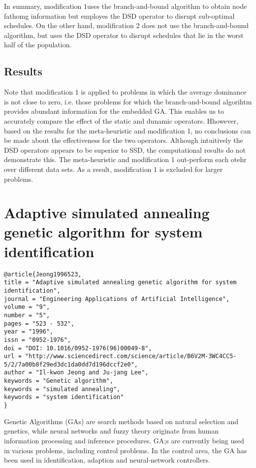\documentclass[pdftex,11pt]{article}
\begin{document}
In summary, modification 1uses the branch-and-bound algorithm to obtain node fathomg information but employes the DSD operator to disrupt sub-optimal schedules. On the other hand, modification 2 does not use the branch-and-bound algorithm, but uses the DSD operator to disrupt schedules that lie in the worst half of the population.

\subsection{Results}
Note that modification 1 is applied to problems in which the average dominance is not close to zero, i.e. those problems for which the branch-and-bound algorihtm provides abundant information for the embedded GA. This enables us to accurately compare the effect of the static and dunamic operators. Hhowever, based on the results for the meta-heuristic and modification 1, no conclusions can be made about the effectiveness for the two operators. Although intuitively the DSD operators appears to be superior to SSD, the computational results do not demonstrate this. The meta-heuristic and modification 1 out-perform each otehr over different data sets. As a result, modification 1 is excluded for larger problems.

\section{Adaptive simulated annealing genetic algorithm for system identification}
\begin{verbatim}
@article{Jeong1996523,
title = "Adaptive simulated annealing genetic algorithm for system identification",
journal = "Engineering Applications of Artificial Intelligence",
volume = "9",
number = "5",
pages = "523 - 532",
year = "1996",
issn = "0952-1976",
doi = "DOI: 10.1016/0952-1976(96)00049-8",
url = "http://www.sciencedirect.com/science/article/B6V2M-3WC4CC5-5/2/7a00b8f29ed3dc1da0dd7d196dccf2e0",
author = "Il-kwon Jeong and Ju-jang Lee",
keywords = "Genetic algorithm",
keywords = "simulated annealing",
keywords = "system identification"
}
\end{verbatim}

Genetic Algorithms (GAs) are search methods based on natural selection and genetics, while neural networks and fuzzy theory originate from human information processing and inference procedures. GA;s are currently being used in various problems, including control problems. In the control area, the GA has been used in identification, adaption and neural-network controllers.
\end{document}
